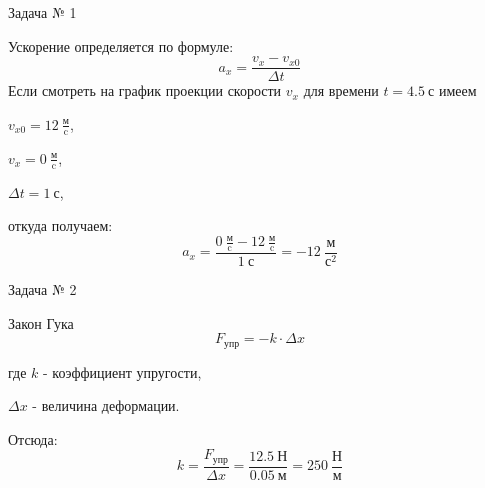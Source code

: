 \documentclass{minimal}
\begin{document}
	Задача № 1

	Ускорение определяется по формуле:
	\[
		a_x=\frac{v_x - v_{x0}}{\Delta t}
	\]
	Если смотреть на график проекции скорости $v_x$ для времени $t=4.5~\text{с}$ имеем 

	$v_{x0}=12~\frac{\text{м}}{\text{c}}$, 

	$v_x=0~\frac{\text{м}}{\text{c}}$,

	$\Delta t=1~\text{с}$, 

	откуда получаем:
	\[
		a_x = \frac{0~\frac{\text{м}}{\text{c}} - 12~\frac{\text{м}}{\text{c}}}{1~\text{с}}=-12~\frac{\text{м}}{\text{с}^2}
	\]

	Задача № 2


	Закон Гука
	\[
		F_{\text{упр}}=-k \cdot \Delta x
	\]

	где $k$ - коэффициент упругости,

	$\Delta x$ - величина деформации.

	Отсюда:
	\[
		k=\frac{F_{\text{упр}}}{\Delta x}=\frac{12.5~\text{Н}}{0.05~\text{м}}=250~\frac{\text{Н}}{\text{м}}
	\]
\end{document}
